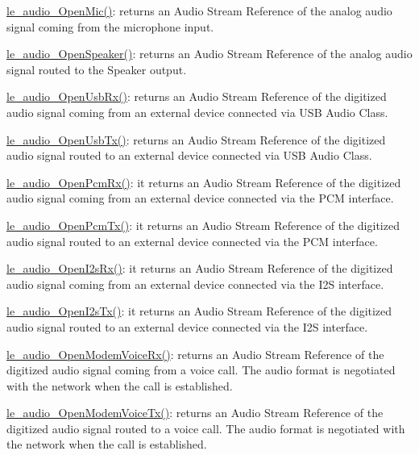 \begin{DoxyItemize}
\item \hyperlink{le__audio__interface_8h_a74f1ef979329f6c2bd56ea622f4d05b2}{le\+\_\+audio\+\_\+\+Open\+Mic()}\+: returns an Audio Stream Reference of the analog audio signal coming from the microphone input.
\item \hyperlink{le__audio__interface_8h_a5c19afce44021c4abf6193707317f8de}{le\+\_\+audio\+\_\+\+Open\+Speaker()}\+: returns an Audio Stream Reference of the analog audio signal routed to the Speaker output.
\item \hyperlink{le__audio__interface_8h_acd8be89289067cef9441a8ed1d891146}{le\+\_\+audio\+\_\+\+Open\+Usb\+Rx()}\+: returns an Audio Stream Reference of the digitized audio signal coming from an external device connected via U\+S\+B Audio Class.
\item \hyperlink{le__audio__interface_8h_adb38f11ac78cf99160c19f69b4db0eb8}{le\+\_\+audio\+\_\+\+Open\+Usb\+Tx()}\+: returns an Audio Stream Reference of the digitized audio signal routed to an external device connected via U\+S\+B Audio Class.
\item \hyperlink{le__audio__interface_8h_aa0f0b5fcab8844c67a936d88fa050cf5}{le\+\_\+audio\+\_\+\+Open\+Pcm\+Rx()}\+: it returns an Audio Stream Reference of the digitized audio signal coming from an external device connected via the P\+C\+M interface.
\item \hyperlink{le__audio__interface_8h_a5e112543e8525775aa670dc71b320766}{le\+\_\+audio\+\_\+\+Open\+Pcm\+Tx()}\+: it returns an Audio Stream Reference of the digitized audio signal routed to an external device connected via the P\+C\+M interface.
\item \hyperlink{le__audio__interface_8h_a9e7d0042c4f422554eb10d64535608e5}{le\+\_\+audio\+\_\+\+Open\+I2s\+Rx()}\+: it returns an Audio Stream Reference of the digitized audio signal coming from an external device connected via the I2\+S interface.
\item \hyperlink{le__audio__interface_8h_a2633c1368adf60e342d7cadbbfa6278b}{le\+\_\+audio\+\_\+\+Open\+I2s\+Tx()}\+: it returns an Audio Stream Reference of the digitized audio signal routed to an external device connected via the I2\+S interface.
\item \hyperlink{le__audio__interface_8h_ae3ed568ba4d2763ea77e17e77b20ff02}{le\+\_\+audio\+\_\+\+Open\+Modem\+Voice\+Rx()}\+: returns an Audio Stream Reference of the digitized audio signal coming from a voice call. The audio format is negotiated with the network when the call is established.
\item \hyperlink{le__audio__interface_8h_ad745f008bb04873c817da7af3daf783d}{le\+\_\+audio\+\_\+\+Open\+Modem\+Voice\+Tx()}\+: returns an Audio Stream Reference of the digitized audio signal routed to a voice call. The audio format is negotiated with the network when the call is established.
\end{DoxyItemize}

